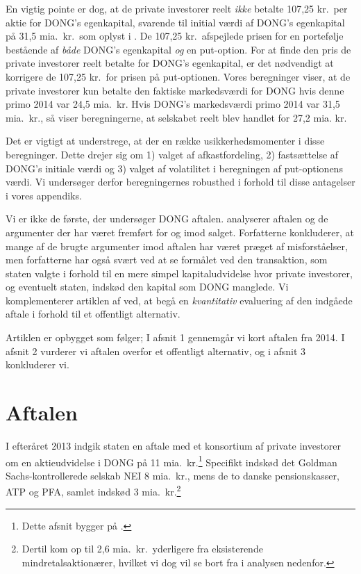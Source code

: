 \documentclass{article}
\begin{document}
En vigtig pointe er dog, at de private investorer reelt \emph{ikke} betalte 107,25 kr.\ per aktie for DONG's egenkapital, svarende til initial værdi af DONG's egenkapital på 31,5 mia.\ kr.\ som oplyst i  \cite{FM2013a}. De 107,25 kr.\ afspejlede prisen for en portefølje bestående af \emph{både} DONG's egenkapital \emph{og} en put-option. For at finde den pris de private investorer reelt betalte for DONG's egenkapital, er det nødvendigt at korrigere de 107,25 kr.\ for prisen på put-optionen. Vores beregninger viser, at de private investorer kun betalte den faktiske markedsværdi for DONG hvis denne primo 2014 var 24,5 mia.\ kr. Hvis DONG's markedsværdi primo 2014 var 31,5 mia.\ kr., så viser beregningerne, at selskabet reelt blev handlet for 27,2 mia. kr.

Det er vigtigt at understrege, at der en række usikkerhedsmomenter i disse beregninger. Dette drejer sig om 1) valget af afkastfordeling, 2) fastsættelse af DONG's initiale værdi og 3) valget af volatilitet i beregningen af put-optionens værdi. Vi undersøger derfor beregningernes robusthed i forhold til disse antagelser i vores appendiks.

Vi er ikke de første, der undersøger DONG aftalen. \cite{Bachman2014} analyserer aftalen og de argumenter der har været fremført for og imod salget. Forfatterne konkluderer, at mange af de brugte argumenter imod aftalen har været præget af misforståelser, men forfatterne har også svært ved at se formålet ved den transaktion, som staten valgte i forhold til en mere simpel kapitaludvidelse hvor private investorer, og eventuelt staten, indskød den kapital som DONG manglede. Vi komplementerer artiklen af \cite{Bachman2014} ved, at begå en \emph{kvantitativ} evaluering af den indgåede aftale i forhold til et offentligt alternativ. 

Artiklen er opbygget som følger; I afsnit 1 gennemgår vi kort aftalen fra 2014. I afsnit 2 vurderer vi aftalen overfor et offentligt alternativ, og i afsnit 3 konkluderer vi.


\section{Aftalen}
I efteråret 2013 indgik staten en aftale med et konsortium af private investorer om en aktieudvidelse i DONG på 11 mia.\ kr.\footnote{Dette afsnit bygger på \citet{FM2013a}.} Specifikt indskød det Goldman Sachs-kontrollerede selskab NEI 8 mia.\ kr., mens de to danske pensionskasser, ATP og PFA, samlet indskød 3 mia.\ kr.\footnote{Dertil kom op til 2,6 mia.\ kr.\ yderligere fra eksisterende mindretalsaktionærer, hvilket vi dog vil se bort fra i analysen nedenfor.}
\end{document}
